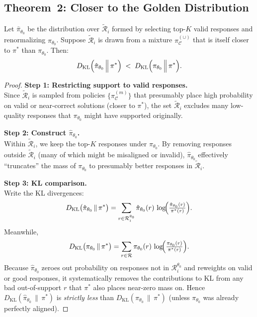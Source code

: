 \subsection{Theorem~2: Closer to the Golden Distribution}

\begin{theorem}
\label{thm:closer-golden}
Let $\hat{\pi}_{\theta_0}$ be the distribution over $\tilde{\mathcal{R}}_i$ formed by selecting top-$K$ valid responses and renormalizing $\pi_{\theta_0}$. Suppose $\tilde{\mathcal{R}}_i$ is drawn from a mixture $\pi_{\mathcal{C}}^{(\cup)}$ that is itself closer to $\pi^*$ than $\pi_{\theta_0}$. Then:
\[
D_{\mathrm{KL}}\Bigl(\hat{\pi}_{\theta_0}\,\Big\|\,\pi^*\Bigr) 
\;<\; 
D_{\mathrm{KL}}\Bigl(\pi_{\theta_0}\,\Big\|\,\pi^*\Bigr).
\]
\end{theorem}

\begin{proof}
\textbf{Step 1: Restricting support to valid responses.}\\
Since $\tilde{\mathcal{R}}_i$ is sampled from policies $\{\pi_{\mathcal{C}}^{(m)}\}$ that presumably place high probability on valid or near-correct solutions (closer to $\pi^*$), the set $\tilde{\mathcal{R}}_i$ excludes many low-quality responses that $\pi_{\theta_0}$ might have supported originally.

\noindent
\textbf{Step 2: Construct $\hat{\pi}_{\theta_0}$.}\\
Within $\tilde{\mathcal{R}}_i$, we keep the top-$K$ responses under $\pi_{\theta_0}$. By removing responses outside $\tilde{\mathcal{R}}_i$ (many of which might be misaligned or invalid), $\hat{\pi}_{\theta_0}$ effectively ``truncates'' the mass of $\pi_{\theta_0}$ to presumably better responses in $\tilde{\mathcal{R}}_i$.

\noindent
\textbf{Step 3: KL comparison.}\\
Write the KL divergences:
\[
D_{\mathrm{KL}}\bigl(\hat{\pi}_{\theta_0}\,\|\,\pi^*\bigr) 
= \sum_{r \in \mathcal{R}_i^{\theta_0}} \hat{\pi}_{\theta_0}(r)\,\log\!\Bigl(\tfrac{\hat{\pi}_{\theta_0}(r)}{\pi^*(r)}\Bigr).
\]
Meanwhile,
\[
D_{\mathrm{KL}}\bigl(\pi_{\theta_0}\,\|\,\pi^*\bigr) 
= \sum_{r \in \mathcal{R}} \pi_{\theta_0}(r)\,\log\!\Bigl(\tfrac{\pi_{\theta_0}(r)}{\pi^*(r)}\Bigr).
\]
Because $\hat{\pi}_{\theta_0}$ zeroes out probability on responses not in $\mathcal{R}_i^{\theta_0}$ and reweights on valid or good responses, it systematically removes the contributions to KL from any bad out-of-support $r$ that $\pi^*$ also places near-zero mass on. 
Hence $D_{\mathrm{KL}}(\hat{\pi}_{\theta_0}\,\|\,\pi^*)$ is \emph{strictly less} than $D_{\mathrm{KL}}(\pi_{\theta_0}\,\|\,\pi^*)$ (unless $\pi_{\theta_0}$ was already perfectly aligned). 
\end{proof}
